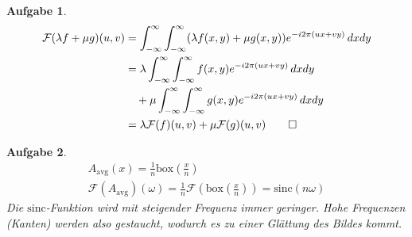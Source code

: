 \documentclass[11pt]{article}
\theoremstyle{break}
\newtheorem{task}{Aufgabe}
\def\fourier{\mathcal{F}}
\def\INT{\int_{-\infty}^{\infty}}
\begin{document}
\begin{task}
    \begin{align*}
        \fourier(\lambda f + \mu g)(u,v) & = \INT\INT (\lambda f(x, y) + \mu g(x, y))e^{-i2\pi(ux + vy)}\, dxdy \\
                                         & = \lambda \INT\INT f(x,y)e^{-i2\pi(ux + vy)}\, dxdy                  \\
                                         & \quad + \mu \INT\INT g(x,y)e^{-i2\pi(ux + vy)}\, dxdy                \\
                                         & = \lambda \fourier(f)(u,v) + \mu \fourier(g)(u,v) \qed
    \end{align*}
\end{task}

\newpage
\begin{task}
    \begin{gather*}
        A_{\text{avg}}(x) = \frac{1}{n} \text{box}(\frac{x}{n})\\
        \fourier(A_{\text{avg}})(\omega) = \frac{1}{n}\fourier(\text{box}(\frac{x}{n})) = \text{sinc}(n\omega)
    \end{gather*}
    Die $\text{sinc}$-Funktion wird mit steigender Frequenz immer geringer. Hohe Frequenzen (Kanten) werden also gestaucht, wodurch es zu einer Glättung des Bildes kommt.
\end{task}
\end{document}
